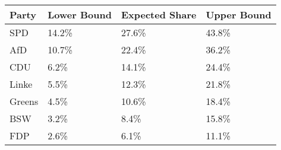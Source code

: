 \begin{tabular}{llll}
  \hline
Party & Lower Bound & Expected Share & Upper Bound \\ 
  \hline
SPD & 14.2\% & 27.6\% & 43.8\% \\ 
  AfD & 10.7\% & 22.4\% & 36.2\% \\ 
  CDU & 6.2\% & 14.1\% & 24.4\% \\ 
  Linke & 5.5\% & 12.3\% & 21.8\% \\ 
  Greens & 4.5\% & 10.6\% & 18.4\% \\ 
  BSW & 3.2\% & 8.4\% & 15.8\% \\ 
  FDP & 2.6\% & 6.1\% & 11.1\% \\ 
   \hline
\end{tabular}
